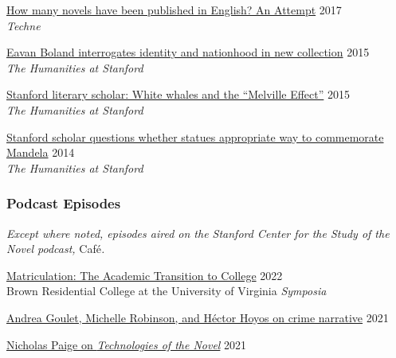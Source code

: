 \documentclass[
  12pt,
  letterpaper,
]{article}
\begin{document}
\href{https://web.archive.org/web/20220323072937/https://litlab.stanford.edu/how-many-novels-have-been-published-in-english-an-attempt/}{How
many novels have been published in English? An Attempt} \hfill 2017\\
\hspace*{0.333em} \emph{Techne}

\href{https://web.archive.org/web/20210810123746/https://news.stanford.edu/news/2015/february/boland-country-book-022615.html}{Eavan
Boland interrogates identity and nationhood in new collection}
\hfill 2015\\
\hspace*{0.333em} \emph{The Humanities at Stanford}

\href{https://web.archive.org/web/20210810125202/https://news.stanford.edu/news/2015/may/melville-scholar-boone-051115.html}{Stanford
literary scholar: White whales and the ``Melville Effect''}
\hfill 2015\\
\hspace*{0.333em} \emph{The Humanities at Stanford}

\href{https://web.archive.org/web/20220611230152/https://news.stanford.edu/pr/2014/pr-mandela-statue-parker-120314.html}{Stanford
scholar questions whether statues appropriate way to commemorate
Mandela} \hfill 2014\\
\hspace*{0.333em} \emph{The Humanities at Stanford}

\hypertarget{podcast-episodes}{%
\subsubsection{Podcast Episodes}\label{podcast-episodes}}

\emph{Except where noted, episodes aired on the Stanford Center
for the Study of the Novel podcast, }Café\emph{.}

\href{https://virginiaaudio.org/\#/symposia/}{Matriculation: The
Academic Transition to College} \hfill 2022\\
\hspace*{0.333em} Brown Residential College at the University of
Virginia \emph{Symposia}

\href{https://web.archive.org/web/20220429010015/https://novel.stanford.edu/csn-cafe/2021/7/23/crime-narratives-with-andrea-goulet-michelle-robinson-and-hctor-hoyos-43021-je87a}{Andrea
Goulet, Michelle Robinson, and Héctor Hoyos on crime narrative}
\hfill 2021

\href{https://web.archive.org/web/20220429093420/https://novel.stanford.edu/csn-cafe/2021/7/23/nicholas-paige-technologies-of-the-novel-2821}{Nicholas
Paige on \emph{Technologies of the Novel}} \hfill 2021
\end{document}
